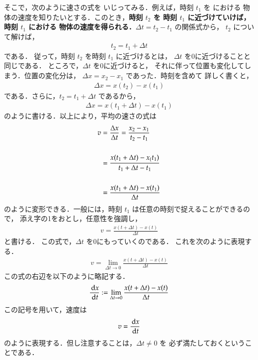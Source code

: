                 そこで，次のように速さの式を
                いじってみる．例えば，時刻 $t_{1}$ を における
                物体の速度を知りたいとする．このとき，\textbf{時刻 $t_{2}$ を
                時刻 $t_{1}$ に近づけていけば，時刻 $t_{1}$ における
                物体の速度を得られる．}$\Delta t=t_{2}-t_{1}$ の関係式から，
                $t_{2}$ について解けば，
                \begin{align}
                    t_{2}=t_{1}+\Delta t
                \end{align}
                である．
                従って，時刻 $t_{2}$ を時刻 $t_{1}$ に近づけるとは，
                $\Delta t$ を0に近づけることと同じである．
                ところで，$\Delta t$ を0に近づけると，
                それに伴って位置も変化してしまう．位置の変化分は，
                $\Delta x=x_{2}-x_{1}$ であった．時刻を含めて
                詳しく書くと，
                \begin{align}
                    \Delta x=x(t_{2})-x(t_{1})
                \end{align}
                である．さらに，$t_{2}=t_{1}+\Delta t$ であるから，
                \begin{align}
                    \Delta x=x(t_{1}+\Delta t)-x(t_{1})
                \end{align}
                のように書ける．以上により，平均の速さの式は
                \begin{align}
                    v   &= \frac{\Delta x}{\Delta t}=\frac{x_{2}-x_{1}}{t_{2}-t_{1}}  \notag \\  \notag \\
                        &= \frac{x(t_{1}+\Delta t)-x_(t_{1})}{t_{1}+\Delta t-t_{1}} \notag \\  \notag \\
                        &= \frac{x(t_{1}+\Delta t)-x(t_{1})}{\Delta t}
                \end{align}
                のように変形できる．一般には，時刻 $t_{1}$ は任意の時刻で捉えることができるので，
                添え字の1をおとし，任意性を強調し，
                \begin{align}
                    v=\frac{x(t+\Delta t)-x(t)}{\Delta t}
                \end{align}
                と書ける．
                この式で，$\Delta t$ を0にもっていくのである．
                これを次のように表現する．
                \begin{align}
                    v=\lim_{\Delta t \to 0}\frac{x(t+\Delta t)-x(t)}{\Delta t}
                \end{align}
                この式の右辺を以下のように略記する．
                \begin{align}
                    \frac{\,\mathrm{d} x}{\,\mathrm{d} t}:=\lim_{\Delta t \to 0}\frac{x(t+\Delta t)-x(t)}{\Delta t}
                \end{align}
                この記号を用いて，速度は
                \begin{align}
                    v=\frac{\,\mathrm{d} x}{\,\mathrm{d} t}
                \end{align}
                のように表現する．但し注意することは，$\Delta t\not= 0$ を
                必ず満たしておくということである．


